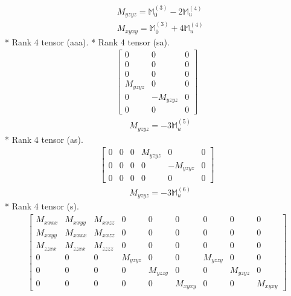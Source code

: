 \documentclass[fleqn,8pt,landscape]{jsarticle}
\begin{document}
\begin{align*}
& M_{yzyz} = \mathbb{M}_{0}^{(3)} - 2 \mathbb{M}_{u}^{(4)} \\
& M_{xyxy} = \mathbb{M}_{0}^{(3)} + 4 \mathbb{M}_{u}^{(4)}
\end{align*}
* Rank 4 tensor (aaa).
* Rank 4 tensor (sa).
\begin{align*}
\begin{bmatrix} 0 & 0 & 0 \\ 0 & 0 & 0 \\ 0 & 0 & 0 \\ M_{yzyz} & 0 & 0 \\ 0 & - M_{yzyz} & 0 \\ 0 & 0 & 0 \end{bmatrix}
\end{align*}
\begin{align*}
& M_{yzyz} = - 3 \mathbb{M}_{u}^{(5)}
\end{align*}
* Rank 4 tensor (as).
\begin{align*}
\begin{bmatrix} 0 & 0 & 0 & M_{yzyz} & 0 & 0 \\ 0 & 0 & 0 & 0 & - M_{yzyz} & 0 \\ 0 & 0 & 0 & 0 & 0 & 0 \end{bmatrix}
\end{align*}
\begin{align*}
& M_{yzyz} = - 3 \mathbb{M}_{u}^{(6)}
\end{align*}
* Rank 4 tensor (s).
\begin{align*}
\begin{bmatrix} M_{xxxx} & M_{xxyy} & M_{xxzz} & 0 & 0 & 0 & 0 & 0 & 0 \\ M_{xxyy} & M_{xxxx} & M_{xxzz} & 0 & 0 & 0 & 0 & 0 & 0 \\ M_{zzxx} & M_{zzxx} & M_{zzzz} & 0 & 0 & 0 & 0 & 0 & 0 \\ 0 & 0 & 0 & M_{yzyz} & 0 & 0 & M_{yzzy} & 0 & 0 \\ 0 & 0 & 0 & 0 & M_{yzzy} & 0 & 0 & M_{yzyz} & 0 \\ 0 & 0 & 0 & 0 & 0 & M_{xyxy} & 0 & 0 & M_{xyxy} \end{bmatrix}
\end{align*}
\end{document}
